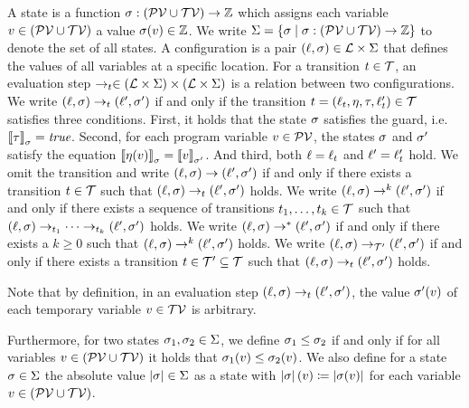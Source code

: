 \begin{definition}[Evaluation] 
  A state is a function $\sigma: (\mathcal{PV} \cup \mathcal{TV}) \rightarrow \mathbb{Z}$ which assigns each variable $v \in (\mathcal{PV} \cup \mathcal{TV})$ a value $\sigma(v) \in \mathbb{Z}$.
  We write $\Sigma = \lbrace  \sigma \mid \sigma: (\mathcal{PV} \cup \mathcal{TV}) \rightarrow \mathbb{Z} \rbrace$ to denote the set of all states.
  A configuration is a pair $(\ell, \sigma) \in \mathcal{L} \times \Sigma$ that defines the values of all variables at a specific location.
  For a transition $t \in \mathcal{T}$, an evaluation step $\rightarrow_t \in (\mathcal{L} \times \Sigma) \times (\mathcal{L} \times \Sigma)$ is a relation between two configurations.
  We write $(\ell, \sigma) \rightarrow_t (\ell', \sigma')$ if and only if the transition $t = (\ell_t, \eta, \tau, \ell_t') \in \mathcal{T}$ satisfies three conditions.
  First, it holds that the state $\sigma$ satisfies the guard, i.e. $\left\llbracket \tau \right\rrbracket_{\sigma} = \emph{true}$.
  Second, for each program variable $v \in \mathcal{PV}$, the states $\sigma$ and $\sigma'$ satisfy the equation $\left\llbracket \eta(v) \right\rrbracket_{\sigma} = \left\llbracket v \right\rrbracket_{\sigma'}$.
  And third, both $\ell = \ell_t$ and $\ell' = \ell_t'$ hold.
  We omit the transition and write $(\ell, \sigma) \rightarrow (\ell', \sigma')$ if and only if there exists a transition $t \in \mathcal{T}$ such that $(\ell, \sigma) \rightarrow_t (\ell', \sigma')$ holds.
  We write $(\ell, \sigma) \rightarrow^k (\ell', \sigma')$ if and only if there exists a sequence of transitions $t_1, \dots, t_k \in \mathcal{T}$ such that $(\ell, \sigma) \rightarrow_{t_1} \dots \rightarrow_{t_k} (\ell', \sigma')$ holds.
  We write $(\ell, \sigma) \rightarrow^* (\ell', \sigma')$ if and only if there exists a $k \geq 0$ such that $(\ell, \sigma) \rightarrow^k (\ell', \sigma')$ holds.
  We write $(\ell, \sigma) \rightarrow_{\mathcal{T}'} (\ell', \sigma')$ if and only if there exists a transition $t \in \mathcal{T}' \subseteq \mathcal{T}$ such that $(\ell, \sigma) \rightarrow_t (\ell', \sigma')$ holds.
\end{definition}

Note that by definition, in an evaluation step $(\ell, \sigma) \rightarrow_t (\ell', \sigma')$, the value $\sigma'(v)$ of each temporary variable $v \in \mathcal{TV}$ is arbitrary.

Furthermore, for two states $\sigma_1, \sigma_2 \in \Sigma$, we define $\sigma_1 \leq \sigma_2$ if and only if for all variables $v \in (\mathcal{PV} \cup \mathcal{TV})$ it holds that $\sigma_1(v) \leq \sigma_2(v)$.
We also define for a state $\sigma \in \Sigma$ the absolute value $\left|\sigma\right| \in \Sigma$ as a state with $\left|\sigma\right|(v) \coloneqq \left|\sigma(v)\right|$ for each variable $v \in (\mathcal{PV} \cup \mathcal{TV})$.

